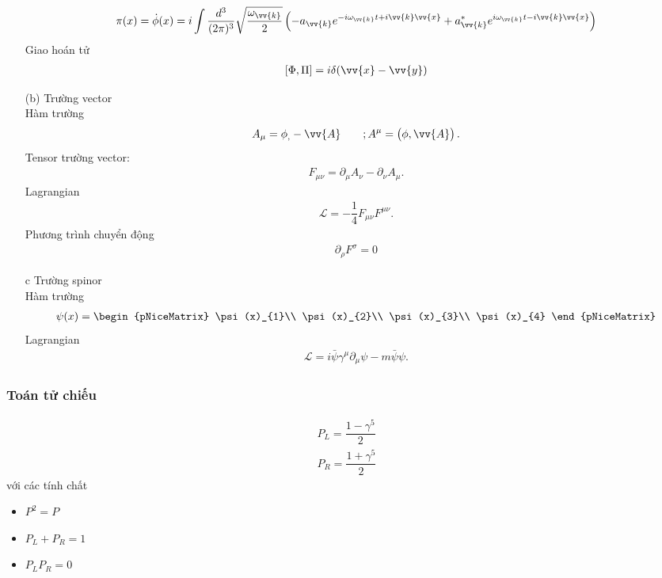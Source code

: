 \documentclass{report}
\newcommand{\f}[2]{\dfrac{#1}{#2}}
\begin{document}
\begin{enumerate}
\begin{align*}
		\pi(x) = \dot{\phi}(x) = i \int \f{d^{3}}{(2\pi)^{3}} \sqrt{\f{\omega_{\vv{k}}}{2}} \left( - a_{\vv{k}} e^{ -i \omega_{\vv{k}} t + i \vv{k} \vv{x} } + a_{\vv{k}}^{*} e^{ i \omega_{\vv{k}} t - i \vv{k} \vv{x} } \right)
	\end{align*}
	Giao hoán tử
	\begin{align*}
		\left[\Phi,\Pi\right] = i \delta(\vv{x} - \vv{y})
	\end{align*}
	\item [(b)] Trường vector\\
	Hàm trường
	\begin{align*}
		A_{\mu} = \phi_{,} - \vv{A} \quad \quad ; A^{\mu} = \left( \phi , \vv{A}\right).
	\end{align*}
	Tensor trường vector:
	\begin{align*}
		F_{\mu\nu} = \partial_{\mu} A_{\nu} - \partial_{\nu} A_{\mu}.
	\end{align*}
	Lagrangian 
	\begin{align*}
		\mathcal{L} = -\f{1}{4} F_{\mu\nu} F^{\mu\nu}.
	\end{align*}
	Phương trình chuyển động
	\begin{align*}
		\partial_{\rho} F^{\sigma} = 0
	\end{align*}
	\item[c] Trường spinor\\
	Hàm trường
	\begin{align*}
		\psi(x) =
		\begin{pNiceMatrix}
			\psi(x)_{1}\\
			\psi(x)_{2}\\
			\psi(x)_{3}\\
			\psi(x)_{4}
		\end{pNiceMatrix}
	\end{align*}
	Lagrangian
	\begin{align*}
		\mathcal{L} = i \bar{\psi} \gamma^{\mu} \partial_{\mu} \psi - m \bar{\psi} \psi.
	\end{align*}
\end{enumerate}
\subsubsection*{Toán tử chiếu}
\begin{align*}
	P_{L} = \f{1 - \gamma^{5}}{2}\\	
	P_{R} = \f{1 + \gamma^{5}}{2}	
\end{align*}
với các tính chất
\begin{itemize}
	\item $P^{2} = P$
	\item $P_{L} + P_{R} = 1$
	\item $P_{L}P_{R} = 0$
\end{itemize}
\end{document}
